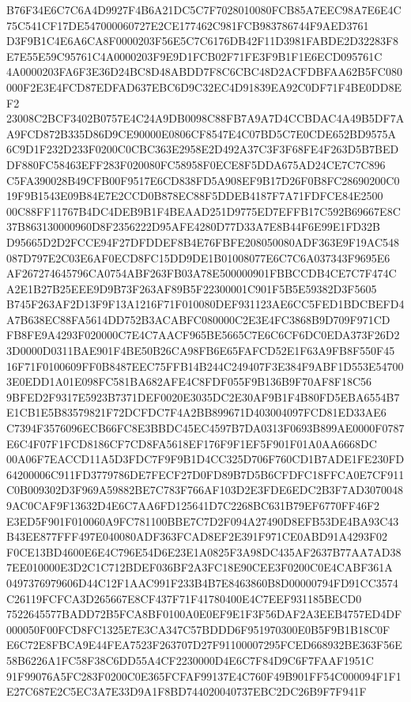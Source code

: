 \documentclass[UTF8,fontset=fandol,zihao=-4,a4paper]{ctexart}
\begin{document}
{{B76F34E6C7C6A4D9927F4B6A21DC5C7F7028010080FCB85A7EEC98A7E6E4C75C541CF17DE547000060727E2CE177462C981FCB983786744F9AED3761
D3F9B1C4E6A6CA8F0000203F56E5C7C6176DB42F11D3981FABDE2D32283F8E7E55E59C95761C4A0000203F9E9D1FCB02F71FE3F9B1F1E6ECD095761C
4A0000203FA6F3E36D24BC8D48ABDD7F8C6CBC48D2ACFDBFAA62B5FC080000F2E3E4FCD87EDFAD637EBC6D9C32EC4D91839EA92C0DF71F4BE0DD8EF2
23008C2BCF3402B0757E4C24A9DB0098C88FB7A9A7D4CCBDAC4A49B5DF7AA9FCD872B335D86D9CE90000E0806CF8547E4C07BD5C7E0CDE652BD9575A
6C9D1F232D233F0200C0CBC363E2958E2D492A37C3F3F68FE4F263D5B7BEDDF880FC58463EFF283F020080FC58958F0ECE8F5DDA675AD24CE7C7C896
C5FA390028B49CFB00F9517E6CD838FD5A908EF9B17D26F0B8FC28690200C019F9B1543E09B84E7E2CCD0B878EC88F5DDEB4187F7A71FDFCE84E2500
00C88FF11767B4DC4DEB9B1F4BEAAD251D9775ED7EFFB17C592B69667E8C37B863130000960D8F2356222D95AFE4280D77D33A7E8B44F6E99E1FD32B
D95665D2D2FCCE94F27DFDDEF8B4E76FBFE208050080ADF363E9F19AC548087D797E2C03E6AF0ECD8FC15DD9DE1B01008077E6C7C6A037343F9695E6
AF267274645796CA0754ABF263FB03A78E500000901FBBCCDB4CE7C7F474CA2E1B27B25EEE9D9B73F263AF89B5F22300001C901F5B5E59382D3F5605
B745F263AF2D13F9F13A1216F71F010080DEF931123AE6CC5FED1BDCBEFD4A7B638EC88FA5614DD752B3ACABFC080000C2E3E4FC3868B9D709F971CD
FB8FE9A4293F020000C7E4C7AACF965BE5665C7E6C6CF6DC0EDA373F26D23D0000D0311BAE901F4BE50B26CA98FB6E65FAFCD52E1F63A9FB8F550F45
16F71F0100609FF0B8487EEC75FFB14B244C249407F3E384F9ABF1D553E547003E0EDD1A01E098FC581BA682AFE4C8FDF055F9B136B9F70AF8F18C56
9BFED2F9317E5923B7371DEF0020E3035DC2E30AF9B1F4B80FD5EBA6554B7E1CB1E5B83579821F72DCFDC7F4A2BB899671D403004097FCD81ED33AE6
C7394F3576096ECB66FC8E3BBDC45EC4597B7DA0313F0693B899AE0000F0787E6C4F07F1FCD8186CF7CD8FA5618EF176F9F1EF5F901F01A0AA6668DC
00A06F7EACCD11A5D3FDC7F9F9B1D4CC325D706F760CD1B7ADE1FE230FD64200006C911FD3779786DE7FECF27D0FD89B7D5B6CFDFC18FFCA0E7CF911
C0B009302D3F969A59882BE7C783F766AF103D2E3FDE6EDC2B3F7AD30700489AC0CAF9F13632D4E6C7AA6FD125641D7C2268BC631B79EF6770FF46F2
E3ED5F901F010060A9FC781100BBE7C7D2F094A27490D8EFB53DE4BA93C43B43EE877FFF497E040080ADF363FCAD8EF2E391F971CE0ABD91A4293F02
F0CE13BD4600E6E4C796E54D6E23E1A0825F3A98DC435AF2637B77AA7AD387EE010000E3D2C1C712BDEF036BF2A3FC18E90CEE3F0200C0E4CABF361A
0497376979606D44C12F1AAC991F233B4B7E8463860B8D00000794FD91CC3574C26119FCFCA3D265667E8CF437F71F41780400E4C7EEF931185BECD0
7522645577BADD72B5FCA8BF0100A0E0EF9E1F3F56DAF2A3EEB4757ED4DF000050F00FCD8FC1325E7E3CA347C57BDDD6F951970300E0B5F9B1B18C0F
E6C72E8FBCA9E44FEA7523F263707D27F91100007295FCED668932BE363F56E58B6226A1FC58F38C6DD55A4CF2230000D4E6C7F84D9C6F7FAAF1951C
91F99076A5FC283F0200C0E365FCFAF99137E4C760F49B901FF54C000094F1F1E27C687E2C5EC3A7E33D9A1F8BD744020040737EBC2DC26B9F7F941F
}}
\end{document}
